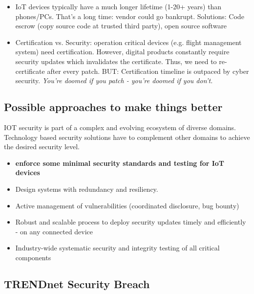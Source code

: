 \documentclass[11pt,oneside,a4paper]{article}
\begin{document}
\vspace{-\topsep}
\begin{itemize}
	\setlength{\itemsep}{0pt}
	\setlength{\parskip}{0pt}
	\item IoT devices typically have a much longer lifetime (1-20+ years) than phones/PCs. That's a long time: vendor could go bankrupt. Solutions: Code escrow (copy source code at trusted third party), open source software
	\item Certification vs. Security: operation critical devices (e.g. flight management system) need certification. However, digital products constantly require security updates which invalidates the certificate. Thus, we need to re-certificate after every patch. BUT: Certification timeline is outpaced by cyber security.
	\subitem \textit{You're doomed if you patch - you're doomed if you don't.}
\end{itemize}
\vspace{-\topsep}

\subsection{Possible approaches to make things better}

IOT security is part of a complex and evolving ecosystem of diverse domains. Technology based security solutions have to complement other domains to achieve the desired security level.

\vspace{-\topsep}
\begin{itemize}
	\setlength{\itemsep}{0pt}
	\setlength{\parskip}{0pt}
	\item \textbf{enforce some minimal security standards and testing for IoT devices}
	\item Design systems with redundancy and resiliency.
	\item Active management of vulnerabilities (coordinated disclosure, bug bounty)
	\item Robust and scalable process to deploy security updates timely and efficiently - on any connected device
	\item Industry-wide systematic security and integrity testing of all critical components
\end{itemize}
\vspace{-\topsep}

\newpage

\subsection{TRENDnet Security Breach}
\end{document}
